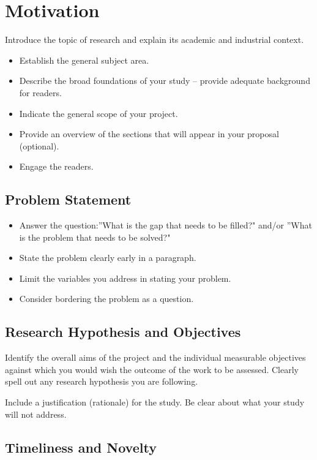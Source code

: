 \documentclass[a4paper,11pt]{article}
\begin{document}
\section{Motivation}

Introduce the topic of research and explain its academic and industrial context.

\begin{itemize}
    \item Establish the general subject area.
    \item Describe the broad foundations of your study -- provide adequate background for readers.
    \item Indicate the general scope of your project.
    \item Provide an overview of the sections that will appear in your proposal (optional).
    \item Engage the readers.
\end{itemize}

\subsection{Problem Statement}

\begin{itemize}
    \item Answer the question:''What is the gap that needs to be filled?"
    and/or ''What is the problem that needs to be solved?"
    \item State the problem clearly early in a paragraph.
    \item Limit the variables you address in stating your problem.
    \item Consider bordering the problem as a question.
\end{itemize}

\subsection{Research Hypothesis and Objectives}

Identify the overall aims of the project and the individual measurable objectives against which you would wish the outcome of the work to be assessed. Clearly spell out any research hypothesis you are following.

Include a justification (rationale) for the study. Be clear about what your study will not address.

\subsection{Timeliness and Novelty}
\end{document}
